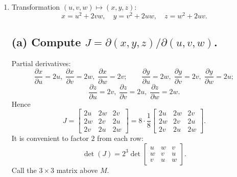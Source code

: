 \documentclass[12pt]{article}
\begin{document}
\begin{enumerate}
\subsection*{(b) Compute $\dfrac{dy}{dx}$ at $(1,y^\ast)$.}
By implicit differentiation,
\[
\frac{dy}{dx} = -\frac{F_x}{F_y}
= -\frac{\frac{2}{y+2x}-2x}{\frac{1}{y+2x}+3}.
\]
At $(1,y^\ast)$ with $y^\ast\approx 3.121$, we have $y^\ast+2\approx 5.121$,
\[
F_x \approx \frac{2}{5.121}-2 \approx 0.3906-2=-1.6094,\quad
F_y \approx \frac{1}{5.121}+3 \approx 0.1953+3=3.1953.
\]
Thus
\[
\left.\frac{dy}{dx}\right|_{(1,y^\ast)} \approx -\frac{-1.6094}{3.1953}\approx 0.504.
\]

\subsection*{(c) Linear approximation for $x:1\to 1.04$.}
Total differential $dF=F_x\,dx+F_y\,dy=0$ gives
\[
dy \approx -\frac{F_x}{F_y}\,dx \approx 0.504\times 0.04 \approx 0.0202.
\]
So $y$ increases by about $0.020$ when $x$ rises from $1$ to $1.04$.

\vspace{1 cm}

\item

Transformation $(u,v,w)\mapsto(x,y,z)$:
\[
x = u^2 + 2vw,\quad
y = v^2 + 2uw,\quad
z = w^2 + 2uv.
\]

\subsection*{(a) Compute $J=\partial(x,y,z)/\partial(u,v,w)$.}
Partial derivatives:
\[
\frac{\partial x}{\partial u}=2u,\; \frac{\partial x}{\partial v}=2w,\; \frac{\partial x}{\partial w}=2v;\qquad
\frac{\partial y}{\partial u}=2w,\; \frac{\partial y}{\partial v}=2v,\; \frac{\partial y}{\partial w}=2u;
\]
\[
\frac{\partial z}{\partial u}=2v,\; \frac{\partial z}{\partial v}=2u,\; \frac{\partial z}{\partial w}=2w.
\]
Hence
\[
J=\begin{bmatrix}
2u & 2w & 2v\\
2w & 2v & 2u\\
2v & 2u & 2w
\end{bmatrix}
= 8\cdot\frac{1}{8}\begin{bmatrix}
2u & 2w & 2v\\
2w & 2v & 2u\\
2v & 2u & 2w
\end{bmatrix}.
\]
It is convenient to factor $2$ from each row:
\[
\det(J)=2^3 \det\!\begin{bmatrix}
u & w & v\\
w & v & u\\
v & u & w
\end{bmatrix}.
\]
Call the $3\times 3$ matrix above $M$.


\end{enumerate}
\end{document}
